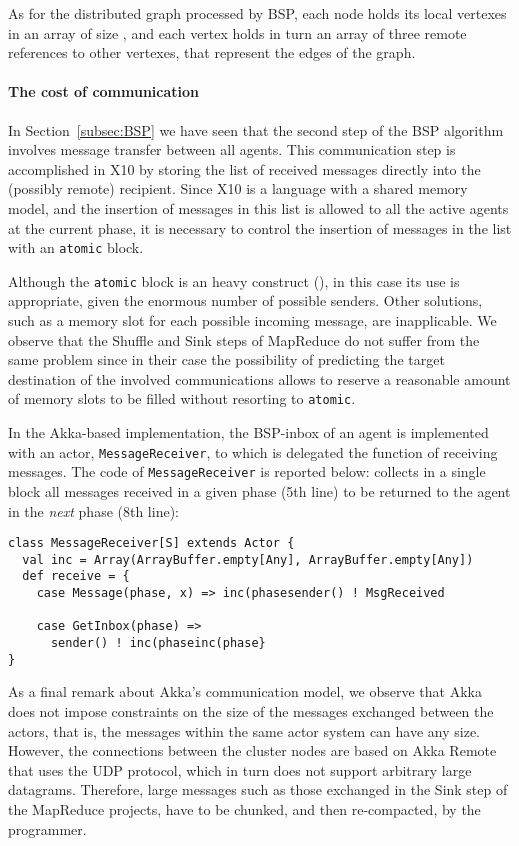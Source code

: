 \documentclass[a4paper]{article}
\numberwithin{equation}{section}
\begin{document}
As for the distributed graph processed by BSP, each node holds its
local vertexes in an array of size , and
each vertex holds in turn an array of three remote references
to other vertexes, that represent the edges of the graph.

\paragraph{The cost of communication}
In Section~\ref{subsec:BSP} we have seen that the second step of the
BSP algorithm involves message transfer between all agents.
This communication step is accomplished in X10 by storing the list of
received messages directly into the (possibly remote) recipient. 
Since X10 is a language with a shared memory model, and the insertion
of messages in this list is allowed to all the active agents at the
current phase, it is necessary to control the insertion of messages in
the list with an \verb+atomic+ block. 

Although the \verb+atomic+ block is an heavy construct 
(\cite{X10-Brief}), in this case
its use is appropriate, given the enormous number of possible
senders. Other solutions, such as a memory slot for each possible
incoming message, are inapplicable. We observe that the Shuffle and
Sink steps of MapReduce do not suffer from the same problem since 
in their case the possibility of predicting the target destination of
the involved communications allows to reserve a reasonable amount of
memory slots to be filled without resorting to
\verb+atomic+.

In the Akka-based implementation, the BSP-inbox of an agent is
implemented with an actor, \verb+MessageReceiver+, to which is
delegated the function of receiving messages. 
The code of \verb+MessageReceiver+ is reported below: 
collects in a single block all messages received in a given phase 
(5th line) to be returned to the agent in the \emph{next} phase (8th
line): 
{\small
\begin{verbatim}
class MessageReceiver[S] extends Actor {
  val inc = Array(ArrayBuffer.empty[Any], ArrayBuffer.empty[Any])
  def receive = {
    case Message(phase, x) => inc(phasesender() ! MsgReceived

    case GetInbox(phase) =>
      sender() ! inc(phaseinc(phase}
}
\end{verbatim}
}


As a final remark about Akka's communication model, we observe that
Akka does not impose constraints on the size of the messages exchanged
between the actors, that is, the messages within the same actor system
can have any size. However, the connections between the cluster
nodes are based on Akka Remote that uses the UDP protocol, which in
turn does not support arbitrary large datagrams. Therefore, 
large messages such as those exchanged in the Sink step of the
MapReduce projects, have to be chunked, and then re-compacted, by the
programmer.
\end{document}
